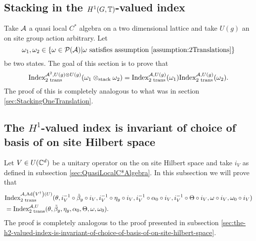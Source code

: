 \documentclass[11pt,a4paper,twoside]{article}
\numberwithin{equation}{section}
\begin{document}
\subsection{Stacking in the $H^1(G,\TT)$-valued index}\label{sec:StackingTwoTranslations}
Take $\AA$ a quasi local $C^*$ algebra on a two dimensional lattice and take $U(g)$ an on site group action arbitrary. Let
\begin{equation}
	\omega_1,\omega_2\in\{\omega\in\PP(\AA)| \omega\text{ satisfies assumption \ref{assumption:2Translations}}\}
\end{equation}
be two states. The goal of this section is to prove that
\begin{equation}\label{eq:IndexMorphismUnderStackingTwoTranslations}
	\textrm{Index}^{\AA^2,U(g)\otimes U(g)}_{\text{2 trans}}(\omega_1\otimes_{\text{stack}}\omega_2)=\textrm{Index}^{\AA,U(g)}_{\text{2 trans}}(\omega_1)\textrm{Index}^{\AA,U(g)}_{\text{2 trans}}(\omega_2).
\end{equation}
The proof of this is completely analogous to what was in section \ref{sec:StackingOneTranslation}.
\subsection{The $H^1$-valued index is invariant of choice of basis of on site Hilbert space}\label{sec:the-h2-valued-index-is-invariant-of-choice-of-basis-of-on-site-hilbert-space-TwoTranslations}
Let $V \in U(\CC^d)$ be a unitary operator on the on site Hilbert space and take $i_V$ as defined in subsection \ref{sec:QuasiLocalC*Algebra}. In this subsection we will prove that
\begin{align}
	&\textrm{Index}^{\AA,\Ad{V^\dagger}(U)}_{2\text{ trans}}(\theta,i_V^{-1}\circ\tilde{\beta}_g\circ i_V,i_V^{-1}\circ\eta_g\circ i_V,i_V^{-1}\circ\alpha_0\circ i_V,i_V^{-1}\circ\Theta\circ i_V,\omega\circ i_V,\omega_0\circ i_V)\\
	&=\textrm{Index}^{\AA,U}_{2\text{ trans}}(\theta,\tilde{\beta}_g,\eta_g,\alpha_0,\Theta,\omega,\omega_0).
\end{align}
The proof is completely analogous to the proof presented in subsection \ref{sec:the-h2-valued-index-is-invariant-of-choice-of-basis-of-on-site-hilbert-space}.
\end{document}
